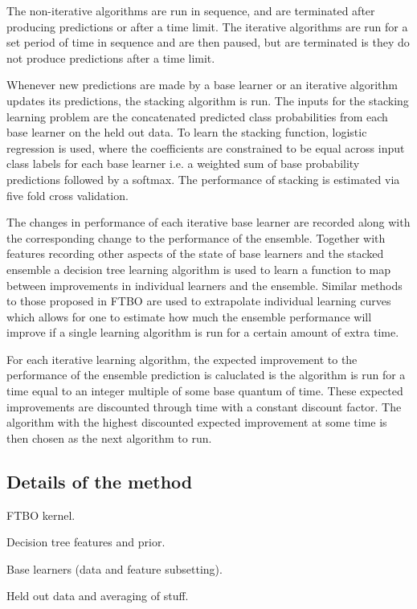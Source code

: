 \documentclass{article} %
\begin{document}
The non-iterative algorithms are run in sequence, and are terminated after producing predictions or after a time limit.
The iterative algorithms are run for a set period of time in sequence and are then paused, but are terminated is they do not produce predictions after a time limit.

Whenever new predictions are made by a base learner or an iterative algorithm updates its predictions, the stacking algorithm is run.
The inputs for the stacking learning problem are the concatenated predicted class probabilities from each base learner on the held out data.
To learn the stacking function, logistic regression is used, where the coefficients are constrained to be equal across input class labels for each base learner i.e. a weighted sum of base probability predictions followed by a softmax.
The performance of stacking is estimated via five fold cross validation.

The changes in performance of each iterative base learner are recorded along with the corresponding change to the performance of the ensemble.
Together with features recording other aspects of the state of base learners and the stacked ensemble a decision tree learning algorithm is used to learn a function to map between improvements in individual learners and the ensemble.
Similar methods to those proposed in FTBO are used to extrapolate individual learning curves which allows for one to estimate how much the ensemble performance will improve if a single learning algorithm is run for a certain amount of extra time.

For each iterative learning algorithm, the expected improvement to the performance of the ensemble prediction is caluclated is the algorithm is run for a time equal to an integer multiple of some base quantum of time.
These expected improvements are discounted through time with a constant discount factor.
The algorithm with the highest discounted expected improvement at some time is then chosen as the next algorithm to run.

\subsection{Details of the method}

FTBO kernel.

Decision tree features and prior.

Base learners (data and feature subsetting).

Held out data and averaging of stuff.
\end{document}
